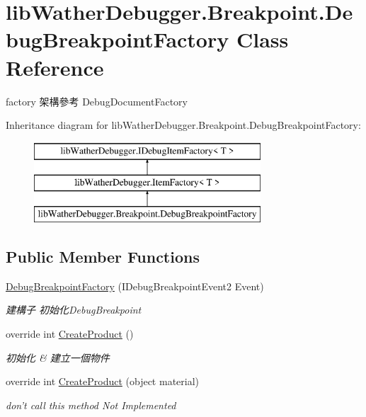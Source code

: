 \hypertarget{classlib_wather_debugger_1_1_breakpoint_1_1_debug_breakpoint_factory}{\section{lib\+Wather\+Debugger.\+Breakpoint.\+Debug\+Breakpoint\+Factory Class Reference}
\label{classlib_wather_debugger_1_1_breakpoint_1_1_debug_breakpoint_factory}
}


factory 架構參考 Debug\+Document\+Factory  


Inheritance diagram for lib\+Wather\+Debugger.\+Breakpoint.\+Debug\+Breakpoint\+Factory\+:\begin{figure}[H]
\begin{center}
\leavevmode
\includegraphics[height=3.000000cm]{classlib_wather_debugger_1_1_breakpoint_1_1_debug_breakpoint_factory}
\end{center}
\end{figure}
\subsection*{Public Member Functions}
\begin{DoxyCompactItemize}
\item 
\hyperlink{classlib_wather_debugger_1_1_breakpoint_1_1_debug_breakpoint_factory_ab384893f5822728ea386ffdbf672480a}{Debug\+Breakpoint\+Factory} (I\+Debug\+Breakpoint\+Event2 Event)
\begin{DoxyCompactList}\small\item\em 建構子 初始化\+Debug\+Breakpoint \end{DoxyCompactList}\item 
override int \hyperlink{classlib_wather_debugger_1_1_breakpoint_1_1_debug_breakpoint_factory_a5faa91bfeb6a7396f3e27016730cf39e}{Create\+Product} ()
\begin{DoxyCompactList}\small\item\em 初始化 \& 建立一個物件 \end{DoxyCompactList}\item 
override int \hyperlink{classlib_wather_debugger_1_1_breakpoint_1_1_debug_breakpoint_factory_a5f5443cff6646bd248964a3f989c34ac}{Create\+Product} (object material)
\begin{DoxyCompactList}\small\item\em don't call this method Not Implemented \end{DoxyCompactList}\end{DoxyCompactItemize}
